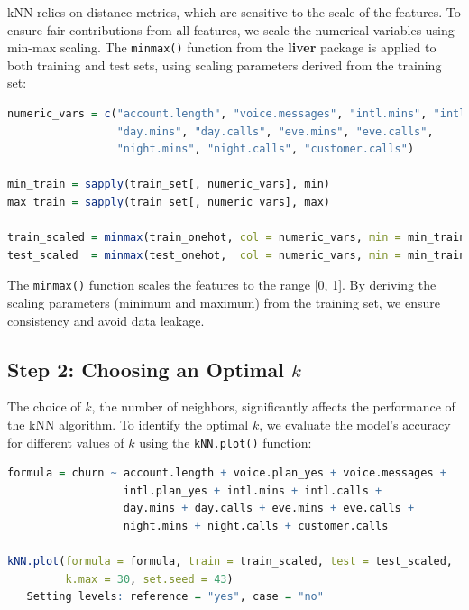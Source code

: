 \documentclass[
]{book}
\newcommand{\passthrough}[1]{#1}
\theoremstyle{definition}
\theoremstyle{definition}
\theoremstyle{definition}
\theoremstyle{definition}
\theoremstyle{remark}
\begin{document}
kNN relies on distance metrics, which are sensitive to the scale of the features. To ensure fair contributions from all features, we scale the numerical variables using min-max scaling. The \passthrough{\lstinline!minmax()!} function from the \textbf{liver} package is applied to both training and test sets, using scaling parameters derived from the training set:

\begin{lstlisting}[language=R]
numeric_vars = c("account.length", "voice.messages", "intl.mins", "intl.calls", 
                 "day.mins", "day.calls", "eve.mins", "eve.calls", 
                 "night.mins", "night.calls", "customer.calls")

min_train = sapply(train_set[, numeric_vars], min)
max_train = sapply(train_set[, numeric_vars], max)

train_scaled = minmax(train_onehot, col = numeric_vars, min = min_train, max = max_train)
test_scaled  = minmax(test_onehot,  col = numeric_vars, min = min_train, max = max_train)
\end{lstlisting}

The \passthrough{\lstinline!minmax()!} function scales the features to the range {[}0, 1{]}. By deriving the scaling parameters (minimum and maximum) from the training set, we ensure consistency and avoid data leakage.

\subsection{\texorpdfstring{Step 2: Choosing an Optimal \(k\)}{Step 2: Choosing an Optimal k}}\label{step-2-choosing-an-optimal-k}

The choice of \(k\), the number of neighbors, significantly affects the performance of the kNN algorithm. To identify the optimal \(k\), we evaluate the model's accuracy for different values of \(k\) using the \passthrough{\lstinline!kNN.plot()!} function:

\begin{lstlisting}[language=R]
formula = churn ~ account.length + voice.plan_yes + voice.messages + 
                  intl.plan_yes + intl.mins + intl.calls + 
                  day.mins + day.calls + eve.mins + eve.calls + 
                  night.mins + night.calls + customer.calls

kNN.plot(formula = formula, train = train_scaled, test = test_scaled, 
         k.max = 30, set.seed = 43)
   Setting levels: reference = "yes", case = "no"
\end{lstlisting}
\end{document}

